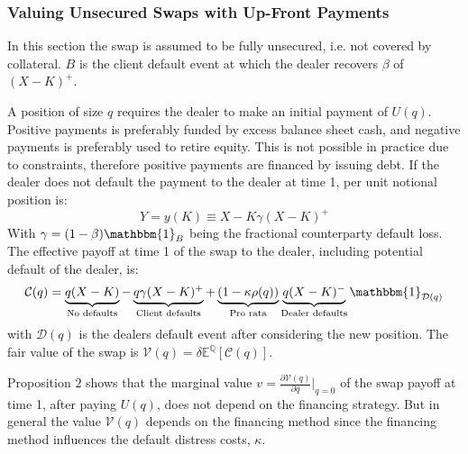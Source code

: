 \documentclass[10pt,a4paper]{article}
\begin{document}
            \subsubsection{Valuing Unsecured Swaps with Up-Front Payments}
                In this section the swap is assumed to be fully unsecured, i.e. not covered by collateral. $B$ is the client default event at which the dealer recovers $\beta$ of $(X-K)^{+}$.

                A position of size $q$ requires the dealer to make an initial payment of $U(q)$. Positive payments is preferably funded by excess balance sheet cash, and negative payments is preferably used to retire equity. This is not possible in practice due to constraints, therefore positive payments are financed by issuing debt. If the dealer does not default the payment to the dealer at time 1, per unit notional position is:
                    \begin{equation}
                        Y = y(K) \equiv X - K \gamma (X-K)^{+}
                    \end{equation}
                With $\gamma=(1-\beta)\mathbbm{1}_{B}$ being the fractional counterparty default loss. The effective payoff at time 1 of the swap to the dealer, including potential default of the dealer, is:
                    \begin{equation}
                        \mathcal{C}(q) 
                            = \underbrace{q(X-K)}_{\text{No defaults}}
                            - \underbrace{q\gamma(X-K)^{+}}_{\text{Client defaults}}
                            + \underbrace{(1-\kappa\rho(q))}_{\text{Pro rata}}
                            \underbrace{q(X-K)^{-}}_{\text{Dealer defaults}}
                            \mathbbm{1}_{\mathcal{D}(q)}
                    \end{equation}
                with $\mathcal{D}(q)$ is the dealers default event after considering the new position. The fair value of the swap is $\mathcal{V}(q) = \delta \mathbb{E}^{\mathbb{Q}}\left[\mathcal{C}(q)\right] $.

                Proposition $2$ shows that the marginal value $v=\frac{\partial \mathcal{V}(q)}{\partial q} |_{q=0}$ of the swap payoff at time 1, after paying $U(q)$, does not depend on the financing strategy. But in general the value $\mathcal{V}(q)$ depends on the financing method since the financing method influences the default distress costs, $\kappa$. 
\end{document}
